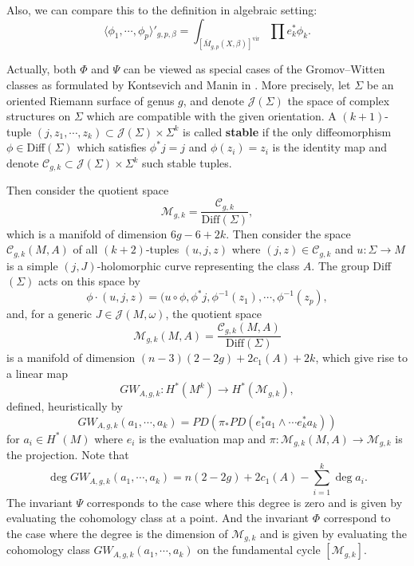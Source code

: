 \documentclass[twoside]{article}
\begin{document}
Also, we can compare this to the definition in algebraic setting:
\[\langle \phi_1,\cdots,\phi_p \rangle'_{g,p,\beta}=\int_{\left[\overline{M}_{g,p}(X,\beta)\right]^{\mathrm{vir}}} \prod e_k^*\phi_k.\]

Actually, both $\Phi$ and $\Psi$ can be viewed as 
special cases of the Gromov--Witten classes as formulated by Kontsevich and Manin in \cite{kontsevich-manin}.
More precisely, let $\Sigma$ be an oriented Riemann surface of genus $g$, 
and denote $\mathscr{J}(\Sigma)$ the space of complex structures on $\Sigma$ 
which are compatible with the given orientation. 
A $(k+1)$-tuple $(j,z_1,\cdots,z_k)\subset \mathscr{J}(\Sigma)\times\Sigma^k$ is called \textbf{stable} 
if the only diffeomorphism $\phi\in$Diff$(\Sigma)$ which satisfies $\phi^*j=j$ 
and $\phi(z_i)=z_i$ is the identity map and denote 
$\mathscr{C}_{g,k}\subset\mathscr{J}(\Sigma)\times\Sigma^k $ such stable tuples.

Then consider the quotient space
\[\mathscr{M}_{g,k}=\frac{\mathscr{C}_{g,k}}{\mathrm{Diff}(\Sigma)},\]
which is a manifold of dimension $6g-6+2k$. Then consider the space
$\mathscr{C}_{g,k}(M,A)$ of all $(k+2)$-tuples $(u,j,z)$ where 
$(j,z)\in \mathscr{C}_{g,k}$ and $u\colon \Sigma\rightarrow M$ is a simple 
$(j,J)$-holomorphic curve representing the class $A$. 
The group Diff$(\Sigma)$ acts on this space by
\[\phi\cdot (u,j,z)=(u\circ\phi,\phi^*j,\phi^{-1}(z_1),\cdots,\phi^{-1}(z_p),\]
and, for a generic $J\in\mathscr{J}(M,\omega)$, the quotient space
\[\mathscr{M}_{g,k}(M,A)=\frac{\mathscr{C}_{g,k}(M,A)}{\mathrm{Diff}(\Sigma)}\]
is a manifold of dimension $(n-3)(2-2g)+2c_1(A)+2k$, which give rise to a linear map
\[\mathit{GW}_{A,g,k}\colon H^*(M^k)\rightarrow H^*(\mathscr{M}_{g,k}),\]
defined, heuristically by
\[\mathit{GW}_{A,g,k}(a_1,\cdots,a_k)=\mathit{PD}(\pi_*\mathit{PD}(e_1^*a_1\wedge\cdots e_k^*a_k))\]
for $a_i\in H^*(M)$ where $e_i$ is the evaluation map and $\pi\colon \mathscr{M}_{g,k}(M,A)\rightarrow \mathscr{M}_{g,k}$ is the projection. 
Note that 
\[\deg \mathit{GW}_{A,g,k}(a_1,\cdots,a_k)=n(2-2g)+2c_1(A)-\sum_{i=1}^{k}\deg a_i.\]
The invariant $\Psi$ corresponds to the case where this degree is zero and is given by 
evaluating the cohomology class at a point. 
And the invariant $\Phi$ correspond to the case where the degree is the dimension of $\mathscr{M}_{g,k}$ 
and is given by evaluating the cohomology class $\mathit{GW}_{A,g,k}(a_1,\cdots,a_k)$ 
on the fundamental cycle $\left[ \mathscr{M}_{g,k} \right]$.

\printbibliography
\end{document}
